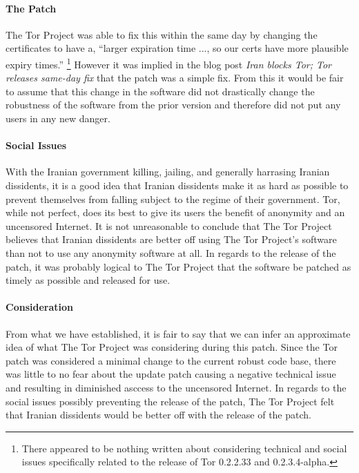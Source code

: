 \documentclass[11pt]{article}
\begin{document}
\begin{multicols}{2}
\paragraph{The Patch} 

The Tor Project was able to fix this within the same day by changing the
certificates to have a, ``larger expiration time ..., so our certs have more
plausible expiry times.'' \cite{IranBlocksTorSameDayFix} \footnote{There appeared to be
nothing written about considering technical and social issues specifically
related to the release of Tor 0.2.2.33 and 0.2.3.4-alpha.}  However it was
implied in the blog post \textit{Iran blocks Tor; Tor releases same-day fix}
that the patch was a simple fix. \cite{IranBlocksTorSameDayFix} From this it
would be fair to assume that this change in the software did not drastically
change the robustness of the software from the prior version and therefore did
not put any users in any new danger.

\paragraph{Social Issues}

With the Iranian government killing, jailing, and generally harrasing Iranian
dissidents, it is a good idea that Iranian dissidents make it as hard as
possible to prevent themselves from falling subject to the regime of their
government.  Tor, while not perfect, does its best to give its users the benefit
of anonymity and an uncensored Internet. It is not unreasonable to conclude that
The Tor Project believes that Iranian dissidents are better off using The Tor
Project's software than not to use any anonymity software at all. In regards to
the release of the patch, it was probably logical to The Tor Project that the
software be patched as timely as possible and released for use.

\paragraph{Consideration}

From what we have established, it is fair to say that we can infer an
approximate idea of what The Tor Project was considering during this patch.
Since the Tor patch was considered a minimal change to the current robust code
base, there was little to no fear about the update patch causing a negative
technical issue and resulting in diminished asccess to the uncensored Internet.
In regards to the social issues possibly preventing the release of the patch,
The Tor Project felt that Iranian dissidents would be better off with the
release of the patch.



\end{multicols}
\end{document}
